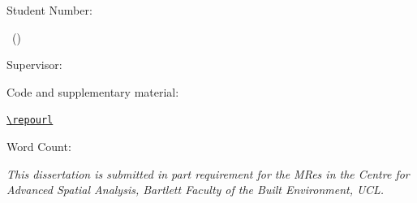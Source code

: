 \begin{titlepage}
    \centering
    \vspace*{1cm}


    {\huge\bfseries \dissertationtitle \par}
    \vspace{2cm}

    {\Large \authorname \par}
    \vspace{0.3cm}
    {\large Student Number: \studentnumber \par}
    \vspace{1.5cm}

    {\large \moduletitle\ (\modulecode) \par}
    \vspace{0.3cm}
    {\large Supervisor: \supervisorname \par}
    \vspace{1.5cm}

    {\large Code and supplementary material:\par
    \href{\repourl}{\nolinkurl{\repourl}} \par}
    \vspace{1cm}

    {\large Word Count: \wordcount \par}
    \vspace{1.5cm}

    {\large \submissiondate \par}

    \vfill

    \begin{minipage}{0.85\textwidth}
        \centering
        \small\itshape
        This dissertation is submitted in part requirement for the MRes in the
        Centre for Advanced Spatial Analysis, Bartlett Faculty of the Built
        Environment, UCL.
    \end{minipage}
    \vspace*{1cm}
\end{titlepage}

